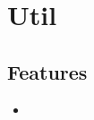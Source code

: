 \section{Util}
\label{module:Util}
\AvailableInJavaAndCsharp{\TODO}
\subsection{Features}
\begin{itemize}
	\item \TODO
\end{itemize}